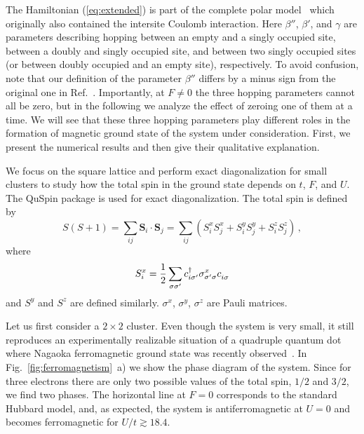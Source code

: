 The Hamiltonian (\ref{eq:extended}) is part of the complete polar model~\cite{vonsovsky1979some1} which originally also contained the intersite Coulomb interaction. Here $\beta''$, $\beta'$, and $\gamma$ are parameters describing hopping between an empty and a singly occupied site, between a doubly and singly occupied site, and between two singly occupied sites (or between doubly occupied and an empty site), respectively. To avoid confusion, note that our definition of the parameter $\beta''$ differs by a minus sign from the original one in Ref.~\cite{vonsovsky1979some1}. Importantly, at $F \neq 0$ the three hopping parameters cannot all be zero, but in the following we analyze the effect of zeroing one of them at a time. We will see that these three hopping parameters play different roles in the formation of magnetic ground state of the system under consideration. First, we present the numerical results and then give their qualitative explanation. 

We focus on the square lattice and perform exact diagonalization for small clusters to study how the total spin in the ground state depends on $t$, $F$, and $U$. The QuSpin package \cite{weinberg2019quspin} is used for exact diagonalization. The total spin is defined by
\begin{equation}\label{eq:spin}
    S(S + 1) = \sum_{ij} \mathbf{S}_i \cdot \mathbf{S}_j = \sum_{ij} (S^x_i S^x_j + S^y_i S^y_j + S^z_i S^z_j)\,,
\end{equation}
where
\begin{equation*}
    S^x_i = \frac{1}{2} \sum_{\sigma\sigma'} c^\dagger_{i\sigma'} \sigma^x_{\sigma'\sigma} c^{\vphantom{\dagger}}_{i\sigma}
\end{equation*}
and $S^y$ and $S^z$ are defined similarly. $\sigma^x$, $\sigma^y$, $\sigma^z$ are Pauli matrices.



Let us first consider a $2\times 2$ cluster. Even though the system is very small, it still reproduces an experimentally realizable situation of a quadruple quantum dot where Nagaoka ferromagnetic ground state was recently observed~\cite{dehollain2020nagaoka}. In Fig.~\ref{fig:ferromagnetism}~a) we show the phase diagram of the system. Since for three electrons there are only two possible values of the total spin, $1/2$ and $3/2$, we find two phases. The horizontal line at $F=0$ corresponds to the standard Hubbard model, and, as expected, the system is antiferromagnetic at $U=0$ and becomes ferromagnetic for $U/t \gtrsim 18.4$.

